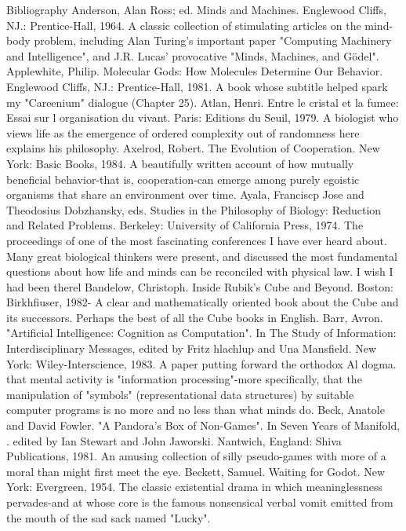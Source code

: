                                         Bibliography
Anderson, Alan Ross; ed. Minds and Machines. Englewood Cliffs, NJ.: Prentice-Hall, 1964.
 A classic collection of stimulating articles on the mind-body problem, including Alan
 Turing's important paper "Computing Machinery and Intelligence", and J.R. Lucas'
 provocative "Minds, Machines, and Gödel".
Applewhite, Philip. Molecular Gods: How Molecules Determine Our Behavior. Englewood
 Cliffs, NJ.: Prentice-Hall, 1981. A book whose subtitle helped spark my "Careenium"
 dialogue (Chapter 25).
Atlan, Henri. Entre le cristal et la fumee: Essai sur l organisation du vivant. Paris: Editions du
 Seuil, 1979. A biologist who views life as the emergence of ordered complexity out of
 randomness here explains his philosophy.
Axelrod, Robert. The Evolution of Cooperation. New York: Basic Books, 1984. A beautifully
 written account of how mutually beneficial behavior-that is, cooperation-can emerge among
 purely egoistic organisms that share an environment over time.
Ayala, Franciscp Jose and Theodosius Dobzhansky, eds. Studies in the Philosophy of
 Biology: Reduction and Related Problems. Berkeley: University of California Press, 1974.
 The proceedings of one of the most fascinating conferences I have ever heard about. Many
 great biological thinkers were present, and discussed the most fundamental questions about
 how life and minds can be reconciled with physical law. I wish I had been therel
Bandelow, Christoph. Inside Rubik's Cube and Beyond. Boston: Birkhfiuser, 1982- A clear
 and mathematically oriented book about the Cube and its successors. Perhaps the best of all
 the Cube books in English.
Barr, Avron. "Artificial Intelligence: Cognition as Computation". In The Study of
 Information: Interdisciplinary Messages, edited by Fritz hlachlup and Una Mansfield. New
 York: Wiley-Interscience, 1983. A paper putting forward the orthodox Al dogma. that
 mental activity is "information processing"-more specifically, that the manipulation of
 "symbols" (representational data structures) by suitable computer programs is no more and
 no less than what minds do.
Beck, Anatole and David Fowler. "A Pandora's Box of Non-Games". In Seven Years of
 Manifold, . edited by Ian Stewart and John Jaworski. Nantwich, England: Shiva
 Publications, 1981. An amusing collection of silly pseudo-games with more of a moral than
 might first meet the eye.
Beckett, Samuel. Waiting for Godot. New York: Evergreen, 1954. The classic existential
 drama in which meaninglessness pervades-and at whose core is the famous nonsensical
 verbal vomit emitted from the mouth of the sad sack named "Lucky".
